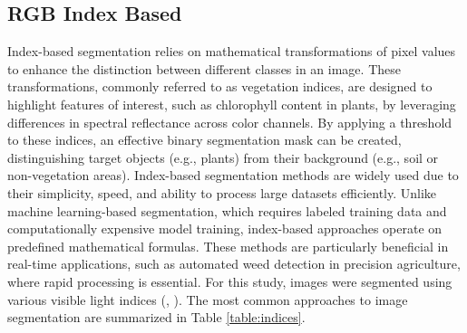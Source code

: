 \documentclass[letterpaper, notitlepage]{report}
\begin{document}
\subsection{RGB Index Based}
Index-based segmentation relies on mathematical transformations of pixel values to enhance the distinction between different classes in an image. These transformations, commonly referred to as vegetation indices, are designed to highlight features of interest, such as chlorophyll content in plants, by leveraging differences in spectral reflectance across color channels. By applying a threshold to these indices, an effective binary segmentation mask can be created, distinguishing target objects (e.g., plants) from their background (e.g., soil or non-vegetation areas). Index-based segmentation methods are widely used due to their simplicity, speed, and ability to process large datasets efficiently. Unlike machine learning-based segmentation, which requires labeled training data and computationally expensive model training, index-based approaches operate on predefined mathematical formulas. These methods are particularly beneficial in real-time applications, such as automated weed detection in precision agriculture, where rapid processing is essential.
For this study, images were segmented using various visible light indices (\cite{Hunt2013-ih}, \cite{Hamuda2016-dw}).  The most common approaches to image segmentation are  summarized in Table \ref{table:indices}.  
\end{document}
